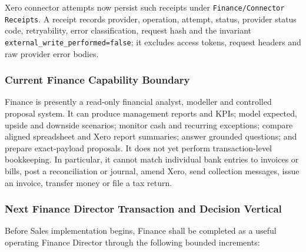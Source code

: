 Xero connector attempts now persist such receipts under
\texttt{Finance/Connector Receipts}.  A receipt records provider, operation, attempt, status,
provider status code, retryability, error classification, request hash and the invariant
\texttt{external\_write\_performed=false}; it excludes access tokens, request headers and raw
provider error bodies.

\subsubsection{Current Finance Capability Boundary}

Finance is presently a read-only financial analyst, modeller and controlled proposal system.
It can produce management reports and KPIs; model expected, upside and downside scenarios;
monitor cash and recurring exceptions; compare aligned spreadsheet and Xero report summaries;
answer grounded questions; and prepare exact-payload proposals.  It does not yet perform
transaction-level bookkeeping.  In particular, it cannot match individual bank entries to
invoices or bills, post a reconciliation or journal, amend Xero, send collection messages,
issue an invoice, transfer money or file a tax return.

\subsubsection{Next Finance Director Transaction and Decision Vertical}

Before Sales implementation begins, Finance shall be completed as a useful operating Finance
Director through the following bounded increments:

